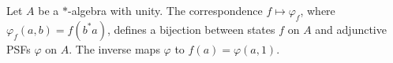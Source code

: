 Let $A$ be a $*$-algebra with unity. The correspondence $f \mapsto \varphi_f$, where $\varphi_f(a, b) = f(b^*a)$, defines a bijection between states $f$ on $A$ and adjunctive PSFs $\varphi$ on $A$. The inverse maps $\varphi$ to $f(a) = \varphi(a, 1)$.

